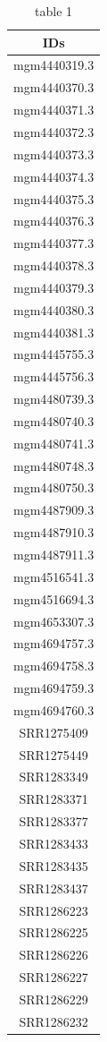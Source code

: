 \documentclass[12pt, a4paper]{report}
\begin{document}
\begin{center}
\begin{longtable}{c}
\caption{table 1}\\
\hline
  IDs\\
\hline
mgm4440319.3\\
mgm4440370.3\\
mgm4440371.3\\
mgm4440372.3\\
mgm4440373.3\\
mgm4440374.3\\
mgm4440375.3\\
mgm4440376.3\\
mgm4440377.3\\
mgm4440378.3\\
mgm4440379.3\\
mgm4440380.3\\
mgm4440381.3\\
mgm4445755.3\\
mgm4445756.3\\
mgm4480739.3\\
mgm4480740.3\\
mgm4480741.3\\
mgm4480748.3\\
mgm4480750.3\\
mgm4487909.3\\
mgm4487910.3\\
mgm4487911.3\\
mgm4516541.3\\
mgm4516694.3\\
mgm4653307.3\\
mgm4694757.3\\
mgm4694758.3\\
mgm4694759.3\\
mgm4694760.3\\
SRR1275409\\
SRR1275449\\
SRR1283349\\
SRR1283371\\
SRR1283377\\
SRR1283433\\
SRR1283435\\
SRR1283437\\
SRR1286223\\
SRR1286225\\
SRR1286226\\
SRR1286227\\
SRR1286229\\
SRR1286232\\

\end{longtable}
\end{center}
\end{document}
